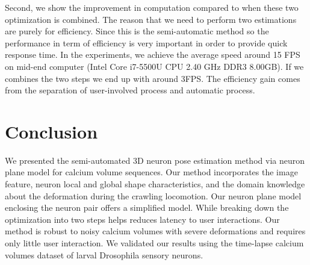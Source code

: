 \documentclass[10pt,letterpaper]{article}
\begin{document}
Second, we show the improvement in computation compared to when these two optimization is combined. The reason that we need to perform two estimations are purely for efficiency. Since this is the semi-automatic method so the performance in term of efficiency is very important in order to provide quick response time. In the experiments, we achieve the average speed around 15 FPS on mid-end computer (Intel Core i7-5500U CPU 2.40 GHz DDR3 8.00GB). If we combines the two steps we end up with around 3FPS. The efficiency gain comes from the separation of user-involved process and automatic process.


\section{Conclusion}

We presented the semi-automated 3D neuron pose estimation method via neuron plane model for calcium volume sequences. Our method incorporates the image feature, neuron local and global shape characteristics, and the domain knowledge about the deformation during the crawling locomotion. Our neuron plane model enclosing the neuron pair offers a simplified model. While breaking down the optimization into two steps helps reduces latency to user interactions. Our method is robust to noisy calcium volumes with severe deformations and requires only little user interaction. We validated our results using the time-lapse calcium volumes dataset of larval Drosophila sensory neurons.



\end{document}
